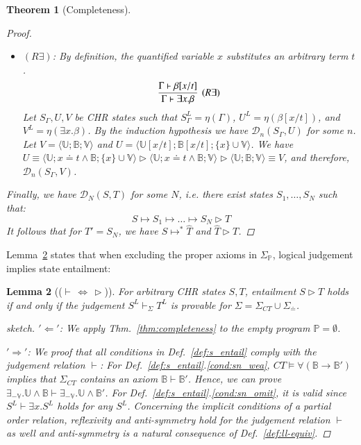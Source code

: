 \documentclass[acmtocl]{acmtrans2m}
\newtheorem{theorem}{Theorem}[section]
\newtheorem{lemma}[theorem]{Lemma}
\newcommand\state[1]{\langle #1 \rangle}
\newcommand\ent{\rhd}
\newcommand\subxt{\left[x/t\right]}
\newcommand\xet{\ensuremath{x\doteq t}}
\newcommand{\bbP}{\ensuremath{\mathbb{P}}}
\newcommand{\B}{\ensuremath{\mathbb{B}}}
\newcommand{\U}{\ensuremath{\mathbb{U}}}
\newcommand{\V}{\ensuremath{\mathbb{V}}}
\newcommand{\cD}{\ensuremath{\mathcal{D}}}
\newcommand{\Sct}{\ensuremath{\Sigma_{CT}}}
\newcommand{\Seq}{\ensuremath{\Sigma_{\doteq}}}
\newcommand{\Sp}{\ensuremath{\Sigma_\mathbb{P}}}
\newcommand{\hT}{\hat{T}}
\begin{document}
\begin{theorem}[Completeness]
\begin{proof}
\begin{itemize}
	  \item $(R\exists)$: By definition, the quantified variable $x$
	  substitutes an
	  arbitrary term $t$.
		\[
			\infer[(R\exists)]{\Gamma\vdash\exists x.\beta}
	            {\Gamma\vdash\beta[x/t]}
	  	\]
	  Let $S_\Gamma,U,V$ be CHR states such that $S_\Gamma^L=\eta(\Gamma)$,
	  $U^L=\eta(\beta\subxt)$, and $V^L=\eta(\exists x.\beta)$. By the
	  induction
	  hypothesis we have $\cD_n(S_\Gamma,U)$ for some $n$. Let
	  $V=\state{\U;\B;\V}$ and $U=\state{\U\subxt;\B\subxt;\{x\}\cup\V}$.
	  We have
	$U
		\equiv \state{\U;\xet\wedge\B;\{x\}\cup\V}
		\ent \state{\U;\xet\wedge\B;\V}
		\ent \state{\U;\B;\V}
		\equiv V
	$,
	and therefore, $\cD_n(S_\Gamma,V)$.
	\end{itemize}
	Finally, we have $\cD_N(S,T)$ for some $N$, i.e. there exist states
	$S_1,\ldots, S_N$ such that:
	\[
		S \mapsto S_1 \mapsto \ldots \mapsto S_N \ent T
	\]
	It follows that for $T'=S_N$, we have $S\mapsto^{*}\hT$ and $\hT\ent T$.
\end{proof}
\end{theorem}

Lemma~\ref{lemma:judge-entail} states that when excluding the proper axioms in
$\Sp$, logical judgement implies state entailment:

\begin{lemma}[($\vdash\,\Leftrightarrow\,\ent$)]
\label{lemma:judge-entail}
   For arbitrary CHR states $S,T$, entailment $S\ent T$ holds \emph{if and only
   if} the judgement $S^L\vdash_\Sigma T^L$ is provable for
   $\Sigma=\Sct\cup\Seq$. \begin{proof}[sketch] \noindent $'\Leftarrow'$: We
   apply Thm.~\ref{thm:completeness} to the empty program $\bbP=\emptyset$.

\noindent $'\Rightarrow'$: We proof that all conditions in
Def.~\ref{def:s_entail} comply with the judgement relation $\vdash$: For
Def.~\ref{def:s_entail}.\ref{cond:sn_wea}, $CT\models\forall(\B\rightarrow\B')$
implies that $\Sct$ contains an axiom $\B\vdash\B'$. Hence, we can prove
$\exists_{-\V}.\U\wedge\B\vdash\exists_{-\V}.\U\wedge\B'$. For
Def.~\ref{def:s_entail}.\ref{cond:sn_omit}, it is valid since $S^L\vdash\exists
x.S^L$ holds for any $S^L$. Concerning the implicit conditions of a partial order
relation, reflexivity and anti-symmetry hold for the judgement relation $\vdash$
as well and anti-symmetry is a natural consequence of Def.~\ref{def:ll-equiv}.
\end{proof}
\end{lemma}
\end{document}
